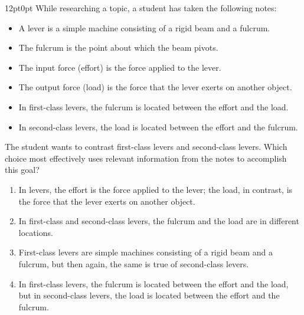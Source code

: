 \documentclass[11pt, twocolumn]{article}
\newcounter{questionnum}
\begin{document}
\vspace{6pt}\noindent
\begin{minipage}{\columnwidth}\raggedright
\noindent{}\par\vspace{8pt}
\begin{adjustwidth}{12pt}{0pt}
While researching a topic, a student has taken the following notes:

\begin{itemize}

\item A lever is a simple machine consisting of a rigid beam and a fulcrum.

\item The fulcrum is the point about which the beam pivots.

\item The input force (effort) is the force applied to the lever.

\item The output force (load) is the force that the lever exerts on another object.

\item In first-class levers, the fulcrum is located between the effort and the load.

\item In second-class levers, the load is located between the effort and the fulcrum.

\end{itemize}
\vspace{6pt}

The student wants to contrast first-class levers and second-class levers. Which choice most effectively uses relevant information from the notes to accomplish this goal?
\begin{enumerate}[label=\Alph*),leftmargin=18pt,topsep=3pt,itemsep=2pt]
  \item In levers, the effort is the force applied to the lever; the load, in contrast, is the force that the lever exerts on another object.
  \item In first-class and second-class levers, the fulcrum and the load are in different locations.
  \item First-class levers are simple machines consisting of a rigid beam and a fulcrum, but then again, the same is true of second-class levers.
  \item In first-class levers, the fulcrum is located between the effort and the load, but in second-class levers, the load is located between the effort and the fulcrum.
\end{enumerate}
\end{adjustwidth}
\end{minipage}\par
\end{document}
